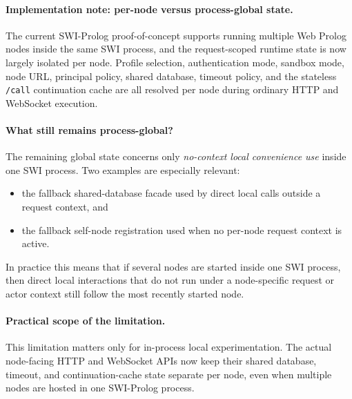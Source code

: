 
\paragraph{Implementation note: per-node versus process-global state.}
The current SWI-Prolog proof-of-concept supports running multiple Web Prolog
nodes inside the same SWI process, and the request-scoped runtime state is now
largely isolated per node. Profile selection, authentication mode, sandbox
mode, node URL, principal policy, shared database, timeout policy, and the
stateless \texttt{/call} continuation cache are all resolved per node during
ordinary HTTP and WebSocket execution.

\paragraph{What still remains process-global?}
The remaining global state concerns only \emph{no-context local convenience
use} inside one SWI process. Two examples are especially relevant:

\begin{itemize}
\item the fallback shared-database facade used by direct local calls outside a
request context, and
\item the fallback self-node registration used when no per-node request context
is active.
\end{itemize}

In practice this means that if several nodes are started inside one SWI
process, then direct local interactions that do not run under a node-specific
request or actor context still follow the most recently started node.

\paragraph{Practical scope of the limitation.}
This limitation matters only for in-process local experimentation. The actual
node-facing HTTP and WebSocket APIs now keep their shared database, timeout,
and continuation-cache state separate per node, even when multiple nodes are
hosted in one SWI-Prolog process.
